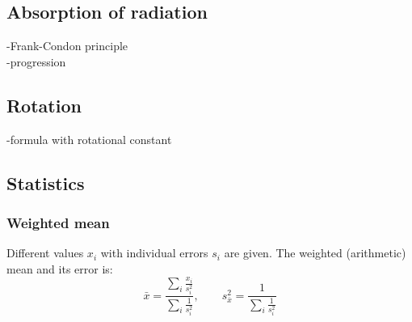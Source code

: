 \subsection{Absorption of radiation}
-Frank-Condon principle \\
-progression

\subsection{Rotation}
-formula with rotational constant

\subsection{Statistics}
\subsubsection{Weighted mean}
Different values $x_i$ with individual errors $s_i$ are given. The weighted (arithmetic) mean and its error is:
\begin{equation}
\label{eq:meanw}
  \bar{x} = \frac{\sum_i \frac{x_i}{s_i^2}}{\sum_i \frac{1}{s_i^2}}, \qquad s_{\bar{x}}^2 = \frac{1}{\sum_i \frac{1}{s_i^2}}
\end{equation}